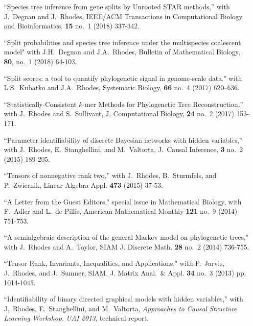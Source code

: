 \documentclass[10pt]{report}
\begin{document}
{{\begin{revnumerate}[44]
 \item 
``Species tree inference from gene splits by Unrooted STAR methods,''
with J.~Degnan and J.~Rhodes,
IEEE/ACM Transactions in Computational Biology and Bioinformatics, 
{\bf 15} no.~1 (2018) 337-342. 

 \item ``Split probabilities and species tree inference under the
multispecies coalescent model"
 with J.H.~Degnan and J.A.~Rhodes,
 Bulletin of Mathematical Biology,
 {\bf 80}, no.~1 (2018) 64-103.

\item ``Split scores: a tool to quantify phylogenetic signal in genome-scale data,"
with L.S.~Kubatko and J.A.~Rhodes,
Systematic Biology,
{\bf 66} no.~4 (2017) 620--636.

\item 
``Statistically-Consistent $k$-mer Methods for Phylogenetic Tree Reconstruction,''
with J.~Rhodes and S.~Sullivant,
J. Computational Biology, 
{\bf 24} no.~2 (2017) 153-171.

\item 
``Parameter identifiability of discrete Bayesian networks with hidden variables,''
with J.~Rhodes, E.~Stanghellini, and M.~Valtorta,
J.~Causal Inference, {\bf 3} no.~2 (2015) 189-205.

\item 
``Tensors of nonnegative rank two,''
with J.~Rhodes, B.~Sturmfels, and P.~Zwiernik,
Linear Algebra Appl. {\bf 473} (2015) 37-53.

\item ``A Letter from the Guest Editors," special issue in 
Mathematical Biology, 
with F.~Adler and L.~de Pillis,
American Mathematical Monthly {\bf 121} no.~9 (2014) 751-753.

\item
``A semialgebraic description of the general Markov model on phylogenetic trees,"
with J.~Rhodes and A.~Taylor, 
SIAM J. Discrete Math. {\bf 28} no.~2 (2014) 736-755.

\item 
``Tensor Rank, Invariants, Inequalities, and Applications,"
with P.~Jarvis, J.~Rhodes, and J.~Sumner, 
SIAM. J. Matrix Anal.~\& Appl. {\bf 34}  no.~3 (2013) pp. 1014-1045.

\item 
``Identifiability of binary directed graphical models with hidden variables,''
with J.~Rhodes, E.~Stanghellini, and M.~Valtorta,
\emph{Approaches to Causal Structure Learning
Workshop, UAI 2013}, technical report.
 

\end{revnumerate}}}
\end{document}

